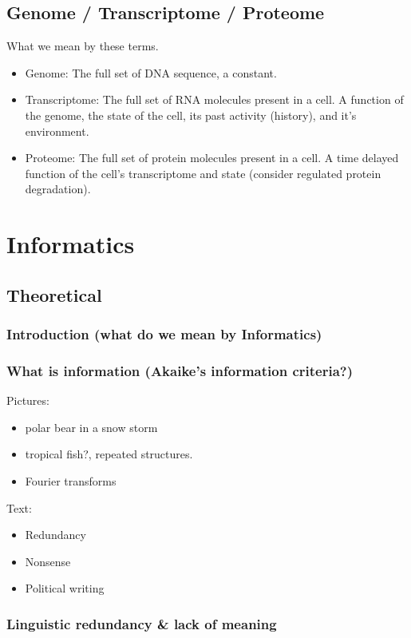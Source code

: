 \documentclass{scrartcl}
\begin{document}
\subsection{Genome / Transcriptome / Proteome}
\label{sec-2-6}

What we mean by these terms.
\begin{itemize}
\item Genome: The full set of DNA sequence, a constant.
\item Transcriptome: The full set of RNA molecules present in a cell.
  A function of the genome, the state of the cell, its past activity
  (history), and it's environment.
\item Proteome: The full set of protein molecules present in a cell.
  A time delayed function of the cell's transcriptome and state
  (consider regulated protein degradation).
\end{itemize}
\section{Informatics}
\label{sec-3}
\subsection{Theoretical}
\label{sec-3-1}
\subsubsection{Introduction (what do we mean by Informatics)}
\label{sec-3-1-1}
\subsubsection{What is information (Akaike's information criteria?)}
\label{sec-3-1-2}

Pictures:
\begin{itemize}
\item polar bear in a snow storm
\item tropical fish?, repeated structures.
\item Fourier transforms
\end{itemize}
Text:
\begin{itemize}
\item Redundancy
\item Nonsense
\item Political writing
\end{itemize}
\subsubsection{Linguistic redundancy \& lack of meaning}
\label{sec-3-1-3}
\end{document}
